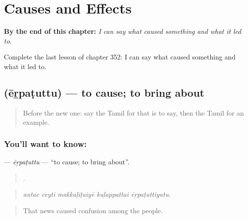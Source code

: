 
\chapter{Causes and Effects}
\label{ch:ta-causes-and-effects}

\begin{chapteropening}
\textbf{By the end of this chapter:} \emph{I can say what caused something and what it led to.}

Complete the last lesson of chapter 352: I can say what caused something and what it led to.
\end{chapteropening}

\section[\texorpdfstring{\ta{ஏற்படுத்து} (ēṟpaṭuttu)}{ஏற்படுத்து (ēṟpaṭuttu)}]{ (ēṟpaṭuttu) — to cause; to bring about}

\label{lesson:TA-C352-erpatuttu}



\begin{quote}
Before the new one: say the Tamil for that is to say, then the Tamil for an example.
\end{quote}

\subsection*{You'll want to know: }
\textbf{} — \emph{ēṟpaṭuttu} — \textquotedblleft{}to cause; to bring about\textquotedblright{}.

\begin{quote}
    .
\end{quote}

\begin{quote}
\emph{antac ceyti makkaḷiṭaiyē kuḻappattai ēṟpaṭuttiyatu.}
\end{quote}

\begin{quote}
That news caused confusion among the people.
\end{quote}

